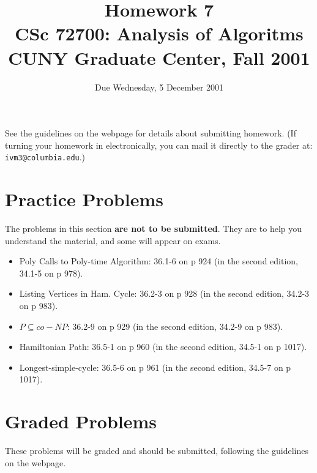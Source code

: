 \documentclass[11pt]{article}
\begin{document}
\title{Homework 7\\
       CSc 72700: Analysis of Algoritms\\
       CUNY Graduate Center, Fall 2001 }
\date{Due Wednesday, 5 December 2001}
\author{}
\maketitle

See the guidelines on the webpage for details about submitting homework.
(If turning your homework in electronically, you can mail it directly
to the grader at: {\tt ivm3@columbia.edu}.)

\section*{Practice Problems}

The problems in this section {\bf are not to be submitted}.  They are to
help you understand the material, and some will appear on exams.

\begin{itemize}
    \item Poly Calls to Poly-time Algorithm:
	36.1-6 on p 924
	(in the second edition, 34.1-5 on p 978).
    \item Listing Vertices in Ham. Cycle:
	36.2-3 on p 928
	(in the second edition, 34.2-3 on p 983).
    \item $P\subseteq co-NP$:
	36.2-9 on p 929
	(in the second edition, 34.2-9 on p 983).
    \item Hamiltonian Path:
	36.5-1 on p 960
	(in the second edition, 34.5-1 on p 1017).
    \item Longest-simple-cycle:
	36.5-6 on p 961
	(in the second edition, 34.5-7 on p 1017).
\end{itemize}

\section*{Graded Problems}

These problems will be graded and should be submitted, following the
guidelines on the webpage.
\end{document}
